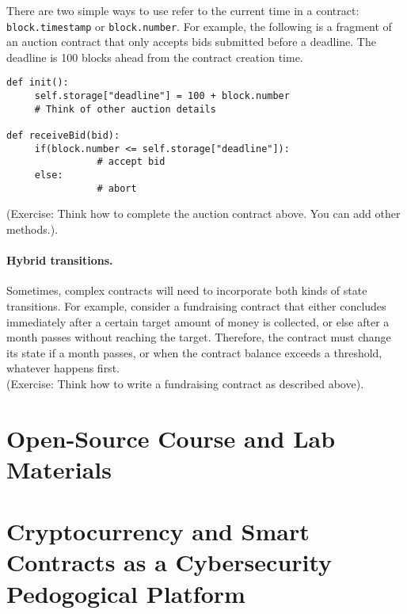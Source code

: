 \documentclass[10pt,twocolumn,letterpaper]{article}
\begin{document}
There are two simple ways to use refer to the current time in a contract: \texttt{block.timestamp} or \texttt{block.number}. For example, the following is a fragment of an auction contract that only accepts bids submitted before a deadline. The deadline is 100 blocks ahead from the contract creation time.

\begin{mdframed}
\begin{verbatim}
def init():
     self.storage["deadline"] = 100 + block.number                
     # Think of other auction details  

def receiveBid(bid):
     if(block.number <= self.storage["deadline"]):
                # accept bid
     else:
                # abort
\end{verbatim}
\end{mdframed}                

(Exercise: Think how to complete the auction contract above. You can add other methods.).

\paragraph{Hybrid transitions.}
Sometimes, complex contracts will need to incorporate both kinds of state transitions. For example, consider a fundraising contract that either concludes immediately after a certain target amount of money is collected, or else after a month passes without reaching the target. Therefore, the contract must change its state if a month passes, or when the contract balance exceeds a threshold, whatever happens first.\\

(Exercise: Think how to write a fundraising contract as described above).

\section{Open-Source Course and Lab Materials}

\section{Cryptocurrency and Smart Contracts as a Cybersecurity Pedogogical Platform}
\end{document}
